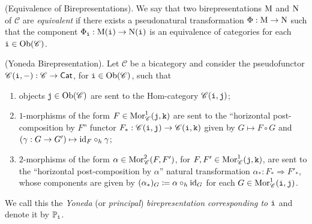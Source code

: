 
\noindent\begin{definition}\textup{(Equivalence of Birepresentations).} We say that two birepresentations $\textup{M}$ and $\textup{N}$ of $\mathscr{C}$ are {\em equivalent} if there exists a pseudonatural transformation $\Phi : \textup{M} \to \textup{N}$ such that the component $\Phi_{\textnormal{\texttt{i}}} : \textup{M}(\textnormal{\texttt{i}}) \to \textup{N}(\textnormal{\texttt{i}})$ is an equivalence of categories for each $\textnormal{\texttt{i}} \in \textnormal{Ob}(\mathscr{C})$.\\
\end{definition}

\noindent\begin{definition}\label{YonedaBirepresentation}\textup{(Yoneda Birepresentation)}. Let $\mathscr{C}$ be a bicategory and consider the pseudofunctor $\mathscr{C}(\textnormal{\texttt{i}}, -) : \mathscr{C} \to \textnormal{\textsf{Cat}}$, for $\textnormal{\texttt{i}} \in \textnormal{Ob}(\mathscr{C})$, such that
\begin{enumerate}[label=$\bullet$, leftmargin=4\parindent]
\item objects $\textnormal{\texttt{j}} \in \textnormal{Ob}(\mathscr{C})$ are sent to the Hom-category $\mathscr{C}(\textnormal{\texttt{i}}, \textnormal{\texttt{j}})$;
\item $1$-morphisms of the form $F \in \textnormal{Mor}_\mathscr{C}^1(\textnormal{\texttt{j}}, \textnormal{\texttt{k}})$ are sent to the ``horizontal post-composition by $F$'' functor $F_* : \mathscr{C}(\textnormal{\texttt{i}}, \textnormal{\texttt{j}}) \to \mathscr{C}(\textnormal{\texttt{i}}, \textnormal{\texttt{k}})$ given by $G \mapsto F \circ G$ and $(\gamma : G \to G') \mapsto \textup{id}_F \circ_h \gamma$;
\item $2$-morphisms of the form $\alpha \in \textnormal{Mor}_\mathscr{C}^2(F, F')$, for $F, F' \in \textnormal{Mor}_\mathscr{C}^1(\textnormal{\texttt{j}}, \textnormal{\texttt{k}})$, are sent to the ``horizontal post-composition by $\alpha$'' natural transformation $\alpha_* : F_* \Rightarrow F'_*$, whose components are given by $(\alpha_*)_G \coloneqq \alpha \circ_h \textup{id}_G$ for each $G \in \textnormal{Mor}_\mathscr{C}^1(\textnormal{\texttt{i}}, \textnormal{\texttt{j}})$. %
\end{enumerate}
\noindent We call this the {\em Yoneda} (or {\em principal}) {\em birepresentation corresponding to $\textnormal{\texttt{i}}$} and denote it by $\mathbb{P}_{\textnormal{\texttt{i}}}$.\\
\end{definition}

